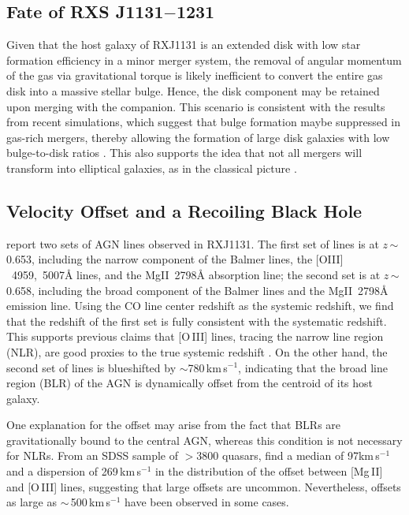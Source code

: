\documentclass[]{emulateapj}
\newcommand{\mgii}{\mbox{Mg{\scriptsize II}~2798\AA}\xspace}
\newcommand{\oiii}{\mbox{$[$O{\scriptsize III}$]$~4959, 5007\AA}\xspace}
\newcommand{\kms}{\mbox{km\,s$^{-1}$}\xspace}
\newcommand{\ssim}{\,$\sim$\,}
\begin{document}
\subsection{Fate of RXS J1131$-$1231}
Given that the host galaxy of RXJ1131 is an extended disk with low star formation efficiency in a minor merger
system, the removal of angular momentum of the gas via gravitational torque is likely inefficient to convert the
entire gas disk into a massive stellar bulge.
Hence, the disk component may be retained upon merging with the companion.
This scenario is consistent with the results from recent simulations, which suggest that bulge formation maybe
suppressed in gas-rich mergers, thereby allowing the formation of large disk galaxies with low bulge-to-disk ratios
\citep{Springel05a, Robertson06a, Hopkins09a}. This also supports the idea that not all mergers will transform into
elliptical galaxies, as in the classical picture \citep{Toomre72a}.


\subsection{Velocity Offset and a Recoiling Black Hole}

\citet[]{Sluse07a} report two sets of AGN lines observed in RXJ1131.
The first set of lines is at $z$\ssim0.653, including the narrow component of the Balmer lines, the \oiii lines, and the \mgii absorption line; the second set is at $z$\ssim0.658, including the broad component of the Balmer lines and
the \mgii emission line.
Using the CO line center redshift as the systemic redshift,
we find that the redshift of the first set is fully consistent with the systematic redshift. This
supports previous claims that [O\,{\scriptsize III}] lines, tracing the narrow line region (NLR),
are good proxies
to the true systemic redshift \citep[e.g.,][]{Vrtilek85a, Nelson00a}.
On the other hand, the second set of lines is blueshifted by $\sim$780\,\kms, indicating that the broad line region (BLR) of the AGN is dynamically offset from the centroid of its host galaxy.

One explanation for the offset may arise from the fact that BLRs are gravitationally bound to
the central AGN, whereas this condition is not necessary for NLRs.
From an SDSS sample of $>$3800 quasars, \citet{Richards02a} find a
median of 97\kms and a dispersion of 269\,\kms in the distribution of
the offset between [Mg\,{\scriptsize II}] and [O\,{\scriptsize III}] lines, suggesting
that large offsets are uncommon. Nevertheless,
offsets as large as $\sim$\,500\,\kms have been observed in some cases.
\end{document}
